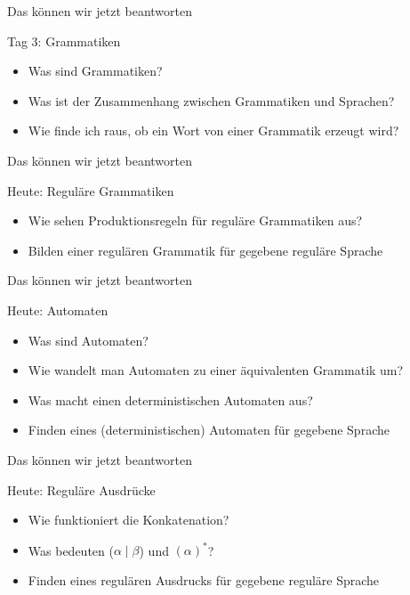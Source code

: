 \begin{frame}[fragile]{Das können wir jetzt beantworten}
    \begin{alertblock}{Tag 3: Grammatiken}
    \begin{itemize}
        \item Was sind Grammatiken?
        \item Was ist der Zusammenhang zwischen Grammatiken und Sprachen?
        \item Wie finde ich raus, ob ein Wort von einer Grammatik erzeugt wird?
    \end{itemize}
    \end{alertblock}
\end{frame}

\begin{frame}[fragile]{Das können wir jetzt beantworten}
	\begin{alertblock}{Heute: Reguläre Grammatiken}
		\begin{itemize}
			\item Wie sehen Produktionsregeln für reguläre Grammatiken aus?
			\item Bilden einer regulären Grammatik für gegebene reguläre Sprache
		\end{itemize}
	\end{alertblock}
\end{frame}

\begin{frame}[fragile]{Das können wir jetzt beantworten}
	\begin{alertblock}{Heute: Automaten}
		\begin{itemize}
        	\item Was sind Automaten?
			\item Wie wandelt man Automaten zu einer äquivalenten Grammatik um?
			\item Was macht einen deterministischen Automaten aus?
			\item Finden eines (deterministischen) Automaten für gegebene Sprache
		\end{itemize}
	\end{alertblock}
\end{frame}

\begin{frame}[fragile]{Das können wir jetzt beantworten}
	\begin{alertblock}{Heute: Reguläre Ausdrücke}
		\begin{itemize}
			\item Wie funktioniert die Konkatenation?
			\item Was bedeuten ($\alpha \mid \beta$) und $(\alpha)^*$?
			\item Finden eines regulären Ausdrucks für gegebene reguläre Sprache
		\end{itemize}
	\end{alertblock}
\end{frame}

